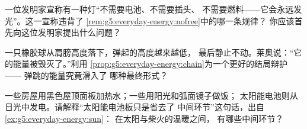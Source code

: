 \begin{exercise}[$\star\star$]\label{exo:g5:everyday-energy:9}
一位发明家宣称有一种灯“不需要电池、不需要插头、
不需要燃料——它会永远发光”。这一宣称违背了
\cref{rem:g5:everyday-energy:nofree}中的哪一条规律？
你应该首先向这位发明家提出什么问题？
\end{exercise}

\begin{exercise}[$\star\star$]\label{exo:g5:everyday-energy:10}
一只橡胶球从肩膀高度落下，弹起的高度越来越低，
最后静止不动。莱奥说：“它的能量被毁灭了。”利用
\cref{prop:g5:everyday-energy:chain}为一个更好的结局辩护——
弹跳的能量究竟滑入了
哪种最终形式？
\end{exercise}

\begin{exercise}[$\star\star$]\label{exo:g5:everyday-energy:11}
一些房屋用黑色屋顶面板加热水；一些用阳光和弧面镜子做饭；
太阳能电池则从日光中发电。请解释“太阳能电池板只是省去了
中间环节”这句话，出自\cref{ex:g5:everyday-energy:sun}：
在太阳与柴火的温暖之间，
有哪些中间环节？
\end{exercise}

